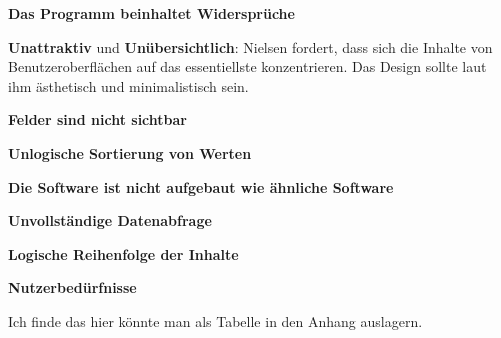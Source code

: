 \textbf{Das Programm beinhaltet Widersprüche}

\textbf{Unattraktiv} und \textbf{Unübersichtlich}: Nielsen fordert, dass sich die Inhalte von Benutzeroberflächen auf das essentiellste konzentrieren. Das Design sollte laut ihm ästhetisch und minimalistisch sein. \cite{Nielsen10}

\textbf{Felder sind nicht sichtbar}

\textbf{Unlogische Sortierung von Werten}

\textbf{Die Software ist nicht aufgebaut wie ähnliche Software} \cite{Nielsen10}

\textbf{Unvollständige Datenabfrage}

\textbf{Logische Reihenfolge der Inhalte}

\textbf{Nutzerbedürfnisse}

Ich finde das hier könnte man als Tabelle in den Anhang auslagern.

